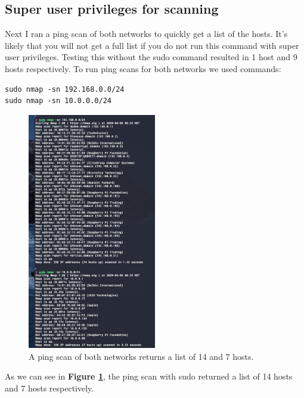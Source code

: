 \documentclass[10pt]{article}
\begin{document}
\medskip
\subsection*{Super user privileges for scanning}
Next I ran a ping scan of both networks to quickly get a list of the hosts. It's likely that you will not get a full list if you do not run this command with super user privileges.
Testing this without the sudo command resulted in 1 host and 9 hosts respectively. To run ping scans for both networks we used commands:
\begin{verbatim}
sudo nmap -sn 192.168.0.0/24
sudo nmap -sn 10.0.0.0/24 \end{verbatim}
\begin{figure}[H]
\centering
\includegraphics[width=0.5\textwidth]{ping.png}
\caption{A ping scan of both networks returns a list of 14 and 7 hosts.}\label{ping image}
\end{figure}
As we can see in \textbf{Figure \ref{ping image}}, the ping scan with sudo returned a list of 14 hosts and 7 hosts respectively. 
\end{document}
